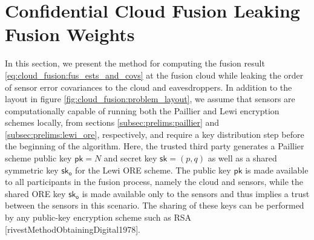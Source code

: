 % 
%                                                                               
%                                                                               
%                                                                               
% 

\section{Confidential Cloud Fusion Leaking Fusion Weights}\label{sec:cloud_fusion:secfci}
In this section, we present the method for computing the fusion result \eqref{eq:cloud_fusion:fus_ests_and_covs} at the fusion cloud while leaking the order of sensor error covariances to the cloud and eavesdroppers. In addition to the layout in figure \ref{fig:cloud_fusion:problem_layout}, we assume that sensors are computationally capable of running both the Paillier and Lewi encryption schemes locally, from sections \ref{subsec:prelims:paillier} and \ref{subsec:prelims:lewi_ore}, respectively, and require a key distribution step before the beginning of the algorithm. Here, the trusted third party generates a Paillier scheme public key $\mathsf{pk}=N$ and secret key $\mathsf{sk}=(p,q)$ as well as a shared symmetric key $\mathsf{sk}_{\mathsf{o}}$ for the Lewi ORE scheme. The public key $\mathsf{pk}$ is made available to all participants in the fusion process, namely the cloud and sensors, while the shared ORE key $\mathsf{sk}_{\mathsf{o}}$ is made available only to the sensors and thus implies a trust between the sensors in this scenario. The sharing of these keys can be performed by any public-key encryption scheme such as RSA [rivestMethodObtainingDigital1978].


